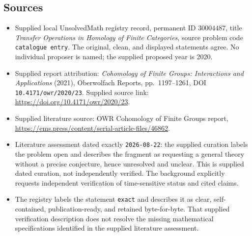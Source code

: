 \documentclass[11pt]{article}
\begin{document}
\subsection{Sources}
\begin{itemize}
\item Supplied local UnsolvedMath registry record, permanent ID \(30004487\), title \emph{Transfer Operations in Homology of Finite Categories}, source problem code \texttt{catalogue entry}. The original, clean, and displayed statements agree. No individual proposer is named; the supplied proposed year is 2020.
\item Supplied report attribution: \emph{Cohomology of Finite Groups: Interactions and Applications} (2021), Oberwolfach Reports, pp.~1197--1261, DOI \texttt{10.4171/owr/2020/23}. Supplied source link: \url{https://doi.org/10.4171/owr/2020/23}.
\item Supplied literature source: OWR Cohomology of Finite Groups report, \url{https://ems.press/content/serial-article-files/46862}.
\item Literature assessment dated exactly \texttt{2026-08-22}: the supplied curation labels the problem open and describes the fragment as requesting a general theory without a precise conjecture, hence unresolved and unclear. This is supplied dated curation, not independently verified. The background explicitly requests independent verification of time-sensitive status and cited claims.
\item The registry labels the statement \texttt{exact} and describes it as clear, self-contained, publication-ready, and retained byte-for-byte. That supplied verification description does not resolve the missing mathematical specifications identified in the supplied literature assessment.
\end{itemize}
\end{document}
